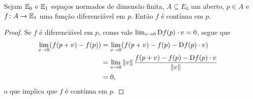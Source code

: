 \begin{proposition}
Sejam $\mathbb{E}_0$ e $\mathbb{E}_1$ espaços normados de dimensão finita, $A \subseteq E_0$ um aberto, $p \in A$ e $f\colon A \to \mathbb{E}_1$ uma função diferenciável em $p$. Então $f$ é contínua em $p$.
\end{proposition}
\begin{proof}
Se $f$ é diferenciável em $p$, como vale $\lim_{v \rightarrow 0}\mathrm{D} f(p) \cdot v = 0$, segue que
	\begin{align*}
	\lim_{v \rightarrow 0} (f(p+v)-f(p)) &= \lim_{v \rightarrow 0}(f(p+v)-f(p)-\mathrm{D} f(p) \cdot v) \\
		&= \lim_{v \rightarrow 0}\left\Vert{v}\right\Vert \frac{f(p+v)-f(p)-\mathrm{D} f(p) \cdot v}{\left\Vert{v}\right\Vert} \\
		&= 0,
	\end{align*}
o que implica que $f$ é contínua em $p$.
\end{proof}


